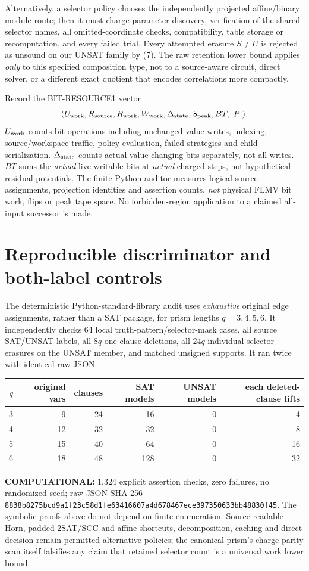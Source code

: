 \documentclass[11pt]{article}
\begin{document}
Alternatively, a selector policy chooses the independently projected affine/binary module route; then it must charge parameter discovery, verification of the shared selector names, all omitted-coordinate checks, compatibility, table storage or recomputation, and every failed trial. Every attempted erasure $S\ne U$ is rejected as unsound on our UNSAT family by (7). The raw retention lower bound applies \emph{only} to this specified composition type, not to a source-aware circuit, direct solver, or a different exact quotient that encodes correlations more compactly.

Record the BIT-RESOURCE1 vector
\[
  (U_{\rm work},R_{\rm source},R_{\rm work},W_{\rm work},
   \Delta_{\rm state},S_{\rm peak},BT,|P|).
\]
$U_{\rm work}$ counts bit operations including unchanged-value writes, indexing, source/workspace traffic, policy evaluation, failed strategies and child serialization. $\Delta_{\rm state}$ counts actual value-changing bits separately, not all writes. $BT$ sums the \emph{actual} live writable bits at \emph{actual} charged steps, not hypothetical residual potentials. The finite Python auditor measures logical source assignments, projection identities and assertion counts, \emph{not} physical FLMV bit work, flips or peak tape space. No forbidden-region application to a claimed all-input successor is made.

\section{Reproducible discriminator and both-label controls}
The deterministic Python-standard-library audit uses \emph{exhaustive} original edge assignments, rather than a SAT package, for prism lengths $q=3,4,5,6$. It independently checks 64 local truth-pattern/selector-mask cases, all source SAT/UNSAT labels, all $8q$ one-clause deletions, all $24q$ individual selector erasures on the UNSAT member, and matched unsigned supports. It ran twice with identical raw JSON.

\begin{center}\small
\begin{tabular}{rrrrrr}
\toprule
$q$ & original vars & clauses & SAT models & UNSAT models & each deleted-clause lifts\\
\midrule
3&9&24&16&0&4\\
4&12&32&32&0&8\\
5&15&40&64&0&16\\
6&18&48&128&0&32\\
\bottomrule
\end{tabular}
\end{center}
\noindent\textbf{COMPUTATIONAL:} 1,324 explicit assertion checks, zero failures, no randomized seed; raw JSON SHA-256
\texttt{8838b8275bcd9a1f23c58d1fe63416607a4d678467ece397350633bb48830f45}.
The symbolic proofs above do not depend on finite enumeration. Source-readable Horn, padded 2SAT/SCC and affine shortcuts, decomposition, caching and direct decision remain permitted alternative policies; the canonical prism's charge-parity scan itself falsifies any claim that retained selector count is a universal work lower bound.
\end{document}
